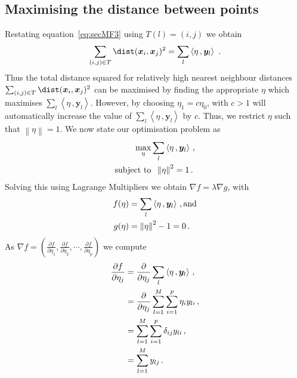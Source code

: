 \documentclass[a4paper,11pt]{article}
\begin{document}
\subsection{Maximising the distance between points}\label{sec:MathFrame2}
Restating equation~\eqref{eq:secMF3} using $T(l) = (i,j)$ we obtain
\begin{equation} \label{eq:secMF4}
    \sum_{(i,j) \in T}\dist(\bm{x}_i, \bm{x}_j)^2 = \sum_{l}\left\langle \eta\, ,  \bm{y}_{l} \right\rangle\, \, .
\end{equation}
Thus  the total distance squared for relatively high nearest neighbour distances $ \sum_{(i,j) \in T}\dist(\bm{x}_i, \bm{x}_j)^2$  can be maximised by finding the appropriate $\eta$ which maximises $\sum_{l}\left\langle \eta\, ,  \bm{y}_{l} \right\rangle$. However, by choosing $\eta_1 = c \eta_0 $, with $c >1$ will automatically increase the value of $\sum_{l}\left\langle \eta\, ,  \bm{y}_{l} \right\rangle$ by $c$. Thus, we restrict $\eta$ such that $\left \lVert \eta \right\rVert = 1$.  We now state our optimisation problem as
\begin{align} \label{eq:secMF5}
     \max_\eta & \sum_{l}\left\langle \eta\, ,  \bm{y}_{l} \right\rangle \, , \\ 
   \text{subject to} & \hspace{0.2cm}   \left \lVert \eta \right\rVert^2  = 1 \notag \, .
\end{align}
Solving this using Lagrange Multipliers we obtain $\nabla f  = \lambda \nabla g$, with 
\begin{align}\label{eq:secMF6}
    f(\eta) & = \sum_{l}\left\langle \eta\, ,  \bm{y}_{l} \right\rangle  \, , \text{and} \\
    g(\eta)  & = \left \lVert \eta \right\rVert^2  - 1 = 0 \, . \notag
\end{align}
As $\nabla f = \left( \frac{\partial f}{\partial \eta_1},  \frac{\partial f}{\partial \eta_2},  \cdots, \frac{\partial f}{\partial \eta_p} \right)$ we compute
\begin{align}\label{eq:secMF7}
\frac{\partial f}{\partial \eta_j} & =  \frac{\partial }{\partial \eta_j}\sum_{l}\left\langle \eta\, ,  \bm{y}_{l} \right\rangle \, ,  \notag  \\
& = \frac{\partial }{\partial \eta_j} \sum_{l=1}^M \sum_{i=1}^p \eta_i y_{li} \, ,\notag \\
& = \sum_{l=1}^M \sum_{i=1}^p  \delta_{ij} y_{li} \, , \notag \\
& = \sum_{l=1}^M y_{lj} \, . 
\end{align}
\end{document}
